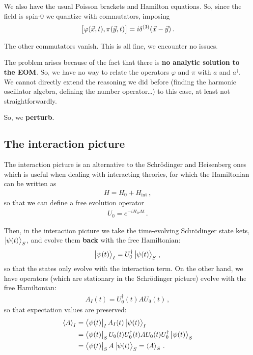 \documentclass[main.tex]{subfiles}
\begin{document}
We also have the usual Poisson brackets and Hamilton equations. 
So, since the field is spin-0 we quantize with commutators, imposing 
%
\begin{align}
\qty[\varphi (\vec{x}, t) , \pi (\vec{y}, t)] = i \delta^{(3)} (\vec{x}-\vec{y})
\,.
\end{align}

The other commutators vanish. 
This is all fine, we encounter no issues.

The problem arises because of the fact that there is \textbf{no analytic solution to the EOM}. 
So, we have no way to relate the operators \(\varphi \) and \(\pi \) with \(a\) and \(a ^\dag\). We cannot directly extend the reasoning we did before (finding the harmonic oscillator algebra, defining the number operator\dots) to this case, at least not straightforwardly. 

So, we \textbf{perturb}. 

\subsection{The interaction picture}

The interaction picture is an alternative to the Schrödinger and Heisenberg ones which is useful when dealing with interacting theories, for which the Hamiltonian can be written as 
%
\begin{align}
H = H_0 + H _{\text{int}}
\,,
\end{align}
%
so that we can define a free evolution operator 
%
\begin{align}
U_0 = e^{-i H_0 \Delta t}
\,.
\end{align}

Then, in the interaction picture we take the time-evolving Schrödinger state kets, \(\ket{\psi (t)}_{S}\), and evolve them \textbf{back} with the free Hamiltonian: 
%
\begin{align}
\ket{\psi (t)}_{I} = U_0 ^\dag \ket{\psi (t)}_{S}
\,,
\end{align}
%
so that the states only evolve with the interaction term. 
On the other hand, we have operators (which are stationary in the Schrödinger picture) evolve with the free Hamiltonian:
%
\begin{align}
A_{I}(t) = U_0 ^\dag (t) A U_0 (t)
\,,
\end{align}
%
so that expectation values are preserved:
%
\begin{subequations}
\begin{align}
\expval{A}_{I} &= \bra{\psi (t)}_{I} A_I (t) \ket{\psi (t)}_{I}   \\
&= \bra{\psi (t)}_{S} U_0 (t) U_0 ^\dag(t) A U_0 (t) U_0 ^\dag \ket{\psi (t)}_{S}  \\
&=  \bra{\psi (t)}_{S} A \ket{\psi (t)}_{S} = \expval{A}_{S}
\,.
\end{align}
\end{subequations}
\end{document}
